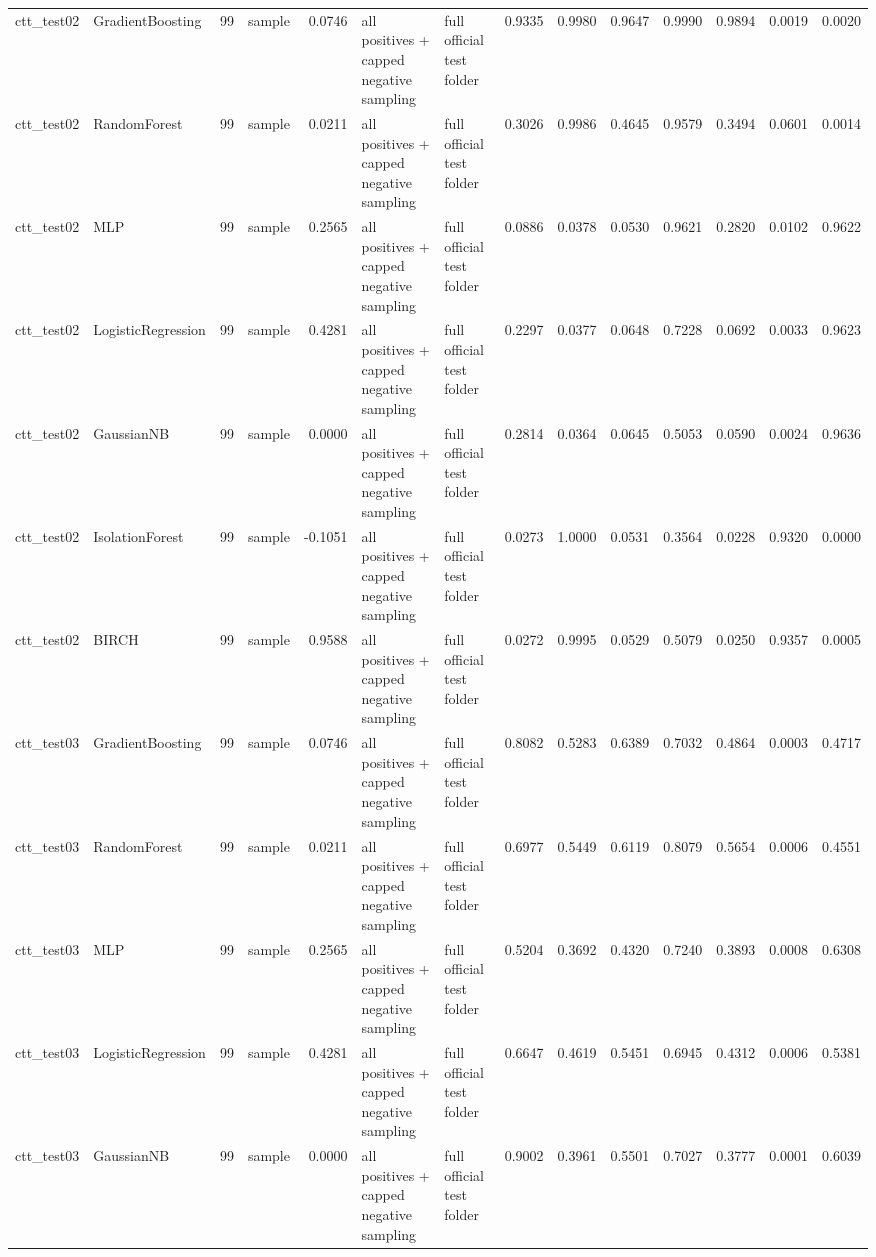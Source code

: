 \begin{tabular}{llrlrllrrrrrrr}
ctt\_test02 & GradientBoosting & 99 & sample & 0.0746 & all positives + capped negative sampling & full official test folder & 0.9335 & 0.9980 & 0.9647 & 0.9990 & 0.9894 & 0.0019 & 0.0020 \\
ctt\_test02 & RandomForest & 99 & sample & 0.0211 & all positives + capped negative sampling & full official test folder & 0.3026 & 0.9986 & 0.4645 & 0.9579 & 0.3494 & 0.0601 & 0.0014 \\
ctt\_test02 & MLP & 99 & sample & 0.2565 & all positives + capped negative sampling & full official test folder & 0.0886 & 0.0378 & 0.0530 & 0.9621 & 0.2820 & 0.0102 & 0.9622 \\
ctt\_test02 & LogisticRegression & 99 & sample & 0.4281 & all positives + capped negative sampling & full official test folder & 0.2297 & 0.0377 & 0.0648 & 0.7228 & 0.0692 & 0.0033 & 0.9623 \\
ctt\_test02 & GaussianNB & 99 & sample & 0.0000 & all positives + capped negative sampling & full official test folder & 0.2814 & 0.0364 & 0.0645 & 0.5053 & 0.0590 & 0.0024 & 0.9636 \\
ctt\_test02 & IsolationForest & 99 & sample & -0.1051 & all positives + capped negative sampling & full official test folder & 0.0273 & 1.0000 & 0.0531 & 0.3564 & 0.0228 & 0.9320 & 0.0000 \\
ctt\_test02 & BIRCH & 99 & sample & 0.9588 & all positives + capped negative sampling & full official test folder & 0.0272 & 0.9995 & 0.0529 & 0.5079 & 0.0250 & 0.9357 & 0.0005 \\
ctt\_test03 & GradientBoosting & 99 & sample & 0.0746 & all positives + capped negative sampling & full official test folder & 0.8082 & 0.5283 & 0.6389 & 0.7032 & 0.4864 & 0.0003 & 0.4717 \\
ctt\_test03 & RandomForest & 99 & sample & 0.0211 & all positives + capped negative sampling & full official test folder & 0.6977 & 0.5449 & 0.6119 & 0.8079 & 0.5654 & 0.0006 & 0.4551 \\
ctt\_test03 & MLP & 99 & sample & 0.2565 & all positives + capped negative sampling & full official test folder & 0.5204 & 0.3692 & 0.4320 & 0.7240 & 0.3893 & 0.0008 & 0.6308 \\
ctt\_test03 & LogisticRegression & 99 & sample & 0.4281 & all positives + capped negative sampling & full official test folder & 0.6647 & 0.4619 & 0.5451 & 0.6945 & 0.4312 & 0.0006 & 0.5381 \\
ctt\_test03 & GaussianNB & 99 & sample & 0.0000 & all positives + capped negative sampling & full official test folder & 0.9002 & 0.3961 & 0.5501 & 0.7027 & 0.3777 & 0.0001 & 0.6039 \\

\end{tabular}
